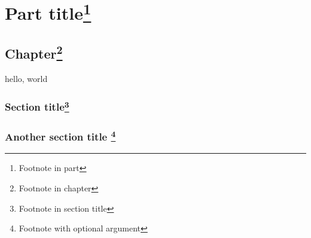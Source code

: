 \documentclass{amsbook}
\begin{document}
\tableofcontents

\part{Part title\footnote{Footnote in part}}

\chapter{Chapter\footnote{Footnote in chapter}}

hello, world

\section{Section title\footnote{Footnote in section title}}

\section{Another section title \footnote[3]{Footnote with optional argument}}
\end{document}
